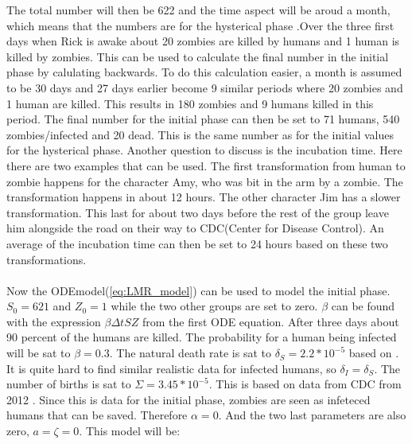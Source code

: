 \documentclass[%
twoside,                 %
final,                   %
10pt]{article}
\begin{document}
\noindent
The total number will then be 622 and the time aspect will be aroud a month, which means that the numbers are for the hysterical phase .Over the three first days when Rick is awake about 20 zombies are killed by humans and 1 human is killed by zombies. This can be used to calculate the final number in the initial phase by calulating backwards. To do this calculation easier, a month is assumed to be 30 days and 27 days earlier become 9 similar periods where 20 zombies and 1 human are killed. This results in 180 zombies and 9 humans killed in this period. The final number for the initial phase can then be set to 71 humans, 540 zombies/infected and 20 dead. This is the same number as for the initial values for the hysterical phase. Another question to discuss is the incubation time. Here there are two examples that can be used. The first transformation from human to zombie happens for the character Amy, who was bit in the arm by a zombie. The transformation happens in about 12 hours. The other character Jim has a slower transformation. This last for about two days before the rest of the group leave him alongside the road on their way to CDC(Center for Disease Control). An average of the incubation time can then be set to 24 hours based on these two transformations.
\\
\\
Now the ODEmodel(\ref{eq:LMR_model}) can be used to model the initial phase. $S_0 = 621$ and $Z_0 = 1$ while the two other groups are set to zero. $\beta$ can be found with the expression $\beta \Delta t S Z$ from the first ODE equation. After three days about 90 percent of the humans are killed. The probability for a human being infected will be sat to $\beta = 0.3$. The natural death rate is sat to $\delta_S = 2.2*10^{-5}$ based on \cite{CBC_deaths_2011}. It is quite hard to find similar realistic data for infected humans, so $\delta_I = \delta_S$. The number of births is sat to $\Sigma = 3.45*10^{-5}$. This is based on data from CDC from 2012 \cite{CBC_births_2012}. Since this is data for the initial phase, zombies are seen as infeteced humans that can be saved. Therefore $\alpha = 0$. And the two last parameters are also zero, $a = \zeta = 0$. This model will be:
\end{document}
